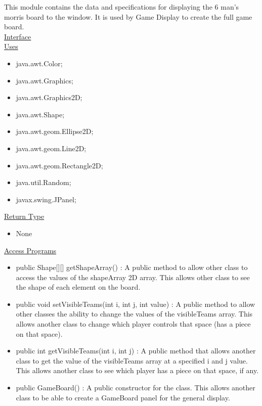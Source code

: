 \documentclass[12pt]{article}
\begin{document}
\begin{itemize}
		This module contains the data and specifications for displaying the 6 man's morris board to the window. It is used by Game Display to create the full game board. \\
		\underline{Interface} \\
		\underline{Uses}
		\begin{itemize}
			\item java.awt.Color;
			\item java.awt.Graphics;
			\item java.awt.Graphics2D;
			\item java.awt.Shape; 
			\item java.awt.geom.Ellipse2D;
			\item java.awt.geom.Line2D;
			\item java.awt.geom.Rectangle2D;
			\item java.util.Random;
			\item javax.swing.JPanel;
		\end{itemize} 
		\underline{Return Type}
		\begin{itemize}
			\item None
		\end{itemize}
		\underline{Access Programs}
		\begin{itemize}
			\item public Shape[][] getShapeArray() : A public method to allow other class to access the values of the shapeArray 2D array. This allows other class to see the shape of each element on the board.
			\item public void setVisibleTeams(int i, int j, int value) : A public method to allow other classes the ability to change the values of the  visibleTeams array. This allows another class to change which player controls that space (has a piece on that space).
			\item public int getVisibleTeams(int i, int j) : A public method that allows another class to get the value of the visibleTeams array at a specified i and j value. This allows another class to see which player has a piece on that space, if any.
			\item public GameBoard() : A public constructor for the class. This allows another class to be able to create a GameBoard panel for the general display.


\end{itemize}
\end{itemize}
\end{document}

